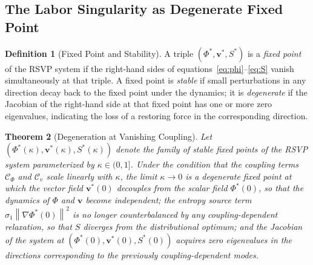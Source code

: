 \documentclass[11pt, a4paper]{article}
\theoremstyle{plain}
\newtheorem{theorem}{Theorem}[section]
\theoremstyle{definition}
\newtheorem{definition}[theorem]{Definition}
\newcommand{\Phifield}{\Phi}
\newcommand{\vfield}{\mathbf{v}}
\newcommand{\Sfield}{S}
\newcommand{\coupling}{\kappa}
\newcommand{\norm}[1]{\left\lVert #1 \right\rVert}
\begin{document}
\subsection{The Labor Singularity as Degenerate Fixed Point}

\begin{definition}[Fixed Point and Stability]
A triple $(\Phifield^*, \vfield^*, \Sfield^*)$ is a \emph{fixed point} of the
RSVP system if the right-hand sides of equations~\eqref{eq:phi}--\eqref{eq:S}
vanish simultaneously at that triple. A fixed point is \emph{stable} if small
perturbations in any direction decay back to the fixed point under the dynamics;
it is \emph{degenerate} if the Jacobian of the right-hand side at that fixed
point has one or more zero eigenvalues, indicating the loss of a restoring
force in the corresponding direction.
\end{definition}

\begin{theorem}[Degeneration at Vanishing Coupling]
\label{thm:degenerate}
Let $(\Phifield^*(\coupling), \vfield^*(\coupling), \Sfield^*(\coupling))$
denote the family of stable fixed points of the RSVP system parameterized by
$\coupling \in (0,1]$. Under the condition that the coupling terms
$\mathcal{C}_\Phi$ and $\mathcal{C}_v$ scale linearly with $\coupling$,
the limit $\coupling \to 0$ is a degenerate fixed point at which the vector
field $\vfield^*(0)$ decouples from the scalar field $\Phifield^*(0)$, so
that the dynamics of $\Phifield$ and $\vfield$ become independent; the entropy
source term $\sigma_1 \norm{\nabla \Phifield^*(0)}^2$ is no longer
counterbalanced by any coupling-dependent relaxation, so that $\Sfield$
diverges from the distributional optimum; and the Jacobian of the system at
$(\Phifield^*(0), \vfield^*(0), \Sfield^*(0))$ acquires zero eigenvalues in
the directions corresponding to the previously coupling-dependent modes.
\end{theorem}
\end{document}
